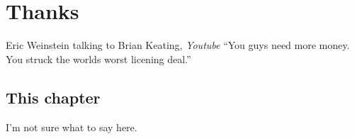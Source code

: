 \documentclass[../rzero]{subfiles}
\begin{document}
\chapter{Thanks}\label{conclusionChapter}

\begin{chapquote}{Eric Weinstein talking to Brian Keating, \textit{Youtube\cite{drbriankeatingEricWeinsteinTheoretical2020}}}
``You guys need more money. You struck the worlds worst licening deal.''
\end{chapquote}


\section{This chapter}
I'm not sure what to say here. 
\end{document}
